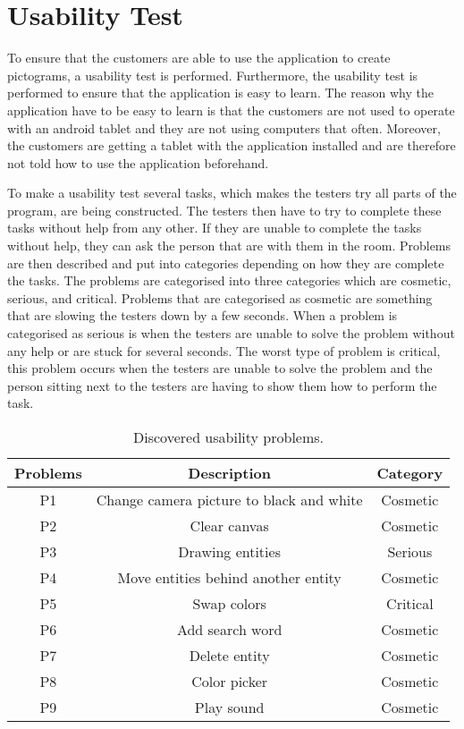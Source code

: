 \section{Usability Test}\label{sec:usability-test}
To ensure that the customers are able to use the application to create pictograms, a usability test is performed.
Furthermore, the usability test is performed to ensure that the application is easy to learn.
The reason why the application have to be easy to learn is that the customers are not used to operate with an android tablet and they are not using computers that often.
Moreover, the customers are getting a tablet with the application installed and are therefore not told how to use the application beforehand.

To make a usability test several tasks, which makes the testers try all parts of the program, are being constructed. 
The testers then have to try to complete these tasks without help from any other.
If they are unable to complete the tasks without help, they can ask the person that are with them in the room.
Problems are then described and put into categories depending on how they are complete the tasks.
The problems are categorised into three categories which are cosmetic, serious, and critical.
Problems that are categorised as cosmetic are something that are slowing the testers down by a few seconds.
When a problem is categorised as serious is when the testers are unable to solve the problem without any help or are stuck for several seconds.
The worst type of problem is critical, this problem occurs when the testers are unable to solve the problem and the person sitting next to the testers are having to show them how to perform the task.

\begin{table}[h]
	\centering 
	\begin{tabular}{|c|c|c|}
		\rowcolor{gray!50}
		\hline 
		Problems & Description & Category \\ 
		\hline
		P1 & Change camera picture to black and white & Cosmetic \\ 
 
		P2 & Clear canvas & Cosmetic \\ 
 
		P3 & Drawing entities & Serious \\ 

		P4 & Move entities behind another entity & Cosmetic \\ 
 
		P5 & Swap colors & Critical \\ 
 
		P6 & Add search word & Cosmetic \\ 
 
		P7 & Delete entity & Cosmetic \\ 
 
		P8 & Color picker & Cosmetic \\ 
 
		P9 & Play sound & Cosmetic \\ 
		\hline 
	\end{tabular} 
	\caption{Discovered usability problems.}
	\label{tab:usability-problems}
\end{table}

